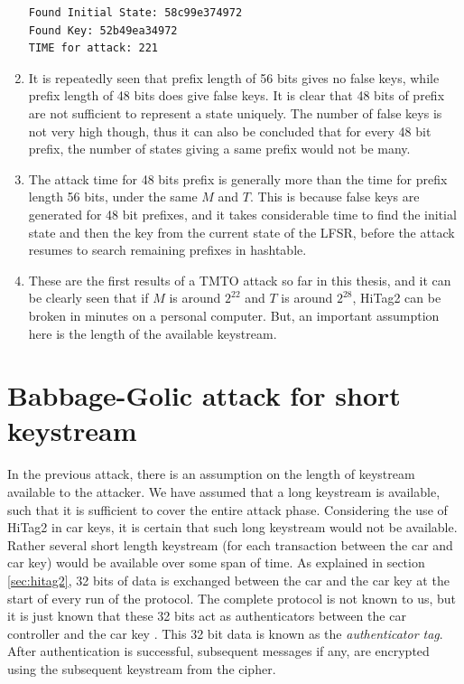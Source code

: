 \begin{enumerate}
\begin{lstlisting}[frame=tb]
Found Initial State: 58c99e374972
Found Key: 52b49ea34972
TIME for attack: 221
\end{lstlisting}

\item It is repeatedly seen that prefix length of 56 bits gives no false keys, while prefix length of 48 bits does give false keys. It is clear that 48 bits of prefix are not sufficient to represent a state uniquely. The number of false keys is not very high though, thus it can also be concluded that for every 48 bit prefix, the number of states giving a same prefix would not be many. 
 
\item The attack time for 48 bits prefix is generally more than the time for prefix length 56 bits, under the same $M$ and $T$. This is because false keys are generated for 48 bit prefixes, and it takes considerable time to find the initial state and then the key from the current state of the LFSR, before the attack resumes to search remaining prefixes in hashtable.

\item These are the first results of a TMTO attack so far in this thesis, and it can be clearly seen that if $M$ is around $2^{22}$ and $T$ is around $2^{28}$, HiTag2 can be broken in minutes on a personal computer. But, an important assumption here is the length of the available keystream.

\end{enumerate}

\section{Babbage-Golic attack for short keystream}
\label{sec:bg-tags-attack}

In the previous attack, there is an assumption on the length of keystream available to the attacker. We have assumed that a long keystream is available, such that it is sufficient to cover the entire attack phase. Considering the use of HiTag2 in car keys, it is certain that such long keystream would not be available. Rather several short length keystream (for each transaction between the car and car key) would be available over some span of time. As explained in section \ref{sec:hitag2}, 32 bits of data is exchanged between the car and the car key at the start of every run of the protocol. The complete protocol is not known to us, but it is just known that these 32 bits act as authenticators between the car controller and the car key \cite{email-ruptor} \cite{hitag2-code}. This 32 bit data is known as the \emph{authenticator tag}. After authentication is successful, subsequent messages if any, are encrypted using the subsequent keystream from the cipher.

